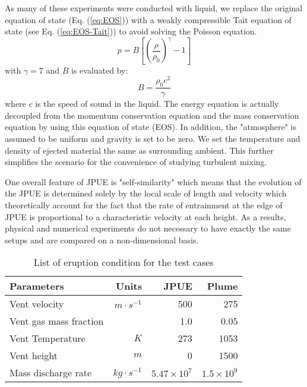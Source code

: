 As many of these experiments were conducted with liquid, we replace the original equation of state (Eq. (\ref{eq:EOS})) with a weakly compressible Tait equation of state \citep {becker2007weakly} (see Eq. (\ref{eq:EOS-Tait})) to avoid solving the Poisson equation.
\begin{equation}
p=B\left[\left(\dfrac{\rho}{\rho_0}\right)^{\gamma}-1\right]
\label{eq:EOS-Tait}
\end{equation}
with $\gamma=7$ and $B$ is evaluated by:
\begin{equation}
B=\dfrac{\rho_0 c^2}{\gamma}
\end{equation}
where $c$ is the speed of sound in the liquid. The energy equation is actually decoupled from the momentum conservation equation and the mass conservation equation by using this equation of state (EOS). In addition, the "atmosphere" is assumed to be uniform and gravity is set to be zero. We set the temperature and density of ejected material the same as surrounding ambient. This further simplifies the scenario for the convenience of studying turbulent mixing. 

One overall feature of JPUE is "self-similarity" which means that the evolution of the JPUE is determined solely by the local scale of length and velocity which theoretically account for the fact that the rate of entrainment at the edge of JPUE is proportional to a characteristic velocity at each height. As a results, physical and numerical experiments do not necessary to have exactly the same setups and are compared on a non-dimensional basis.

\begin{table}[htp]
\centering
	\begin{centering}
      \caption{List of eruption condition for the test cases}		
	  \begin{tabular}{lrrr}
	    \hline
	    Parameters & Units  & JPUE & Plume \\
	    \hline
	    Vent velocity          & $m\cdot s^{-1}$  & 500               & 275 \\
	    Vent gas mass fraction &                  & 1.0               & 0.05 \\
	    Vent Temperature       & $K$              & 273               & 1053 \\
	    Vent height            & $m$              & 0                 & 1500 \\
	    Mass discharge rate    & $kg\cdot s^{-1}$ & $5.47 \times 10^7$ & $1.5 \times 10^9$\\
	    \hline
	  \end{tabular}
	  \label{tab:input_parameters}
	\end{centering}
\end{table}

